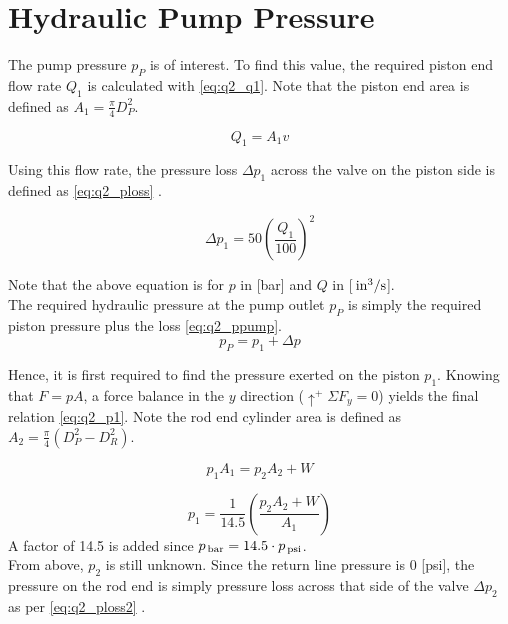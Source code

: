 \section{Hydraulic Pump Pressure}

The pump pressure $p_P$ is of interest. To find this value, the required piston end flow rate $Q_1$ is calculated with \ref{eq:q2_q1}. Note that the piston end area is defined as $A_1 = \tfrac{\pi}{4} D_P^2$.

\begin{equation}
	\label{eq:q2_q1}
	Q_1 = A_1 v
\end{equation}

Using this flow rate, the pressure loss $\Delta p_1$ across the valve on the piston side is defined as \ref{eq:q2_ploss} \cite{assign}.

\begin{equation}
	\label{eq:q2_ploss}
	\Delta p_1 = 50 \left( \frac{Q_1}{100} \right)^2
\end{equation}

Note that the above equation is for $p$ in [bar] and $Q$ in [$\,\mathrm{in^3/s}$].\\

The required hydraulic pressure at the pump outlet $p_P$ is simply the required piston pressure plus the loss \ref{eq:q2_ppump}.
\begin{equation}
	\label{eq:q2_ppump}
	p_P = p_1 + \Delta p
\end{equation}

Hence, it is first required to find the pressure exerted on the piston $p_1$. Knowing that $F=pA$, a force balance in the $y$ direction ($\uparrow^+  \Sigma F_y = 0$) yields the final relation \ref{eq:q2_p1}. Note the rod end cylinder area is defined as $A_2 = \tfrac{\pi}{4}\left( D_P^2 - D_R^2 \right)$.

\begin{equation*}
	p_1 A_1 = p_2 A_2 + W
\end{equation*}

\begin{equation}
	\label{eq:q2_p1}
	p_1 = \frac{1}{14.5} \left(\frac{p_2 A_2 + W}{A_1} \right)
\end{equation}
A factor of 14.5 is added since $p_{\,\mathrm{bar}} = 14.5 \cdot p_{\,\mathrm{psi}}$.\\

From above, $p_2$ is still unknown. Since the return line pressure is 0 [psi], the pressure on the rod end is simply pressure loss across that side of the valve $\Delta p_2$ as per \ref{eq:q2_ploss2} \cite{assign}.

